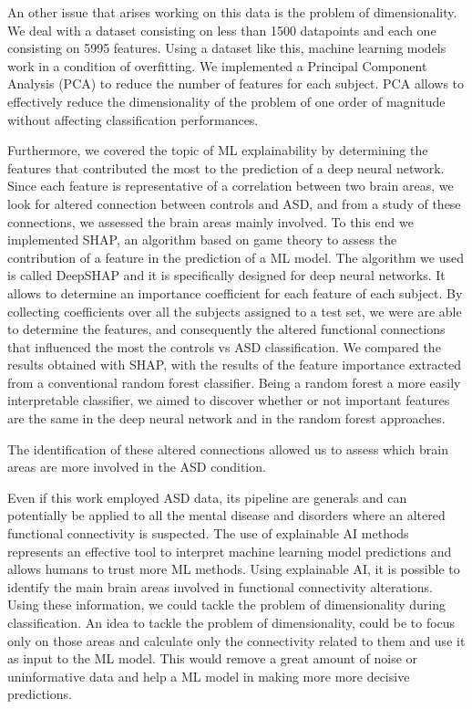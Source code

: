 \documentclass[11pt]{report}
\begin{document}
An other issue that arises working on this data is the problem of dimensionality.
We deal with a dataset consisting on less than 1500 datapoints and each one consisting on 5995 features.
Using a dataset like this, machine learning models work in a condition of overfitting. 
We implemented a Principal Component Analysis (PCA) to reduce the number of features for each subject.
PCA allows to effectively reduce the dimensionality of the problem of one order of magnitude without affecting classification performances.


Furthermore, we covered the topic of ML explainability by determining the features that contributed the most to the prediction of a deep neural network.
Since each feature is representative of a correlation between two brain areas, we look for altered connection between controls and ASD, and from a study of these connections, we assessed the brain areas mainly involved.
To this end we implemented SHAP, an algorithm based on game theory to assess the contribution of a feature in the prediction of a ML model.
The algorithm we used is called DeepSHAP and it is specifically designed for deep neural networks. 
It allows to determine an importance coefficient for each feature of each subject.
By collecting coefficients over all the subjects assigned to a test set, we were are able to determine the features, and consequently the altered functional connections that influenced the most the controls vs ASD classification.
We compared the results obtained with SHAP, with the results of the feature importance extracted from a conventional random forest classifier.
Being a random forest a more easily interpretable classifier, we aimed to discover whether or not important features are the same in the deep neural network and in the random forest approaches.

The identification of these altered connections allowed us to assess which brain areas are more involved in the ASD condition. 


Even if this work employed ASD data, its pipeline are generals and can potentially be applied to all the mental disease and disorders where an altered functional connectivity is suspected.
The use of explainable AI methods represents an effective tool to interpret machine learning model predictions and allows humans to trust more ML methods.
Using explainable AI, it is possible to identify the main brain areas involved in functional connectivity alterations. 
Using these information, we could tackle the problem of dimensionality during classification.
An idea to tackle the problem of dimensionality, could be to focus only on those areas and calculate only the connectivity related to them and use it as input to the ML model.
This would remove a great amount of noise or uninformative data and help a ML model in making more more decisive predictions.
\end{document}
